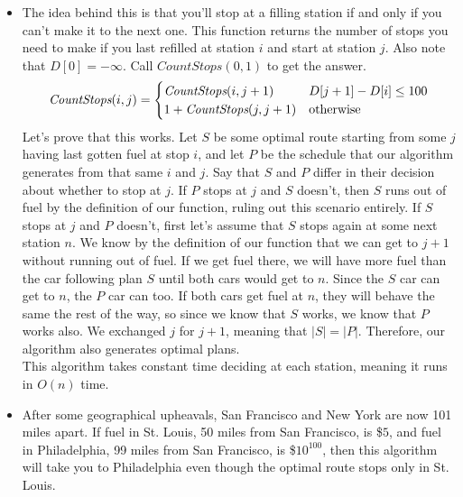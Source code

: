 \documentclass[11pt]{article}
\begin{document}
\begin{solution}
    \begin{itemize}
    \item The idea behind this is that you'll stop at a filling station if and only if you can't make it to the next one. This function returns the number of stops you need to make if you last
        refilled at station $i$ and start at station $j$. Also note that $D[0] = -\infty$. Call $CountStops(0, 1)$ to get the answer.
        \[
            \emph{CountStops}(i, j) = 
            \begin{cases} 
                \emph{CountStops}(i, j + 1) & D[j + 1] - D[i] \leq 100 \\
                            1 + \emph{CountStops}(j, j + 1) & \text{otherwise}
            \end{cases}
            \]
        Let's prove that this works. Let $S$ be some optimal route starting from some $j$ having last gotten fuel at stop $i$, and let $P$ be the schedule that our algorithm generates from that same $i$ and $j$. Say that $S$ and $P$ differ in their decision about whether to stop at $j$. If $P$ stops at $j$ and $S$ doesn't, then $S$ runs out of fuel by the definition of our function, ruling out this scenario entirely. 
            If $S$ stops at $j$ and $P$ doesn't, first let's assume that $S$ stops again at some next station $n$. We know by the definition of our function that we can get to $j + 1$ without running out of fuel. If we get fuel there, we will have more fuel than the car following plan $S$ until both cars would get to $n$. Since the $S$ car can get to $n$, the $P$ car can too. If both cars get fuel at $n$, they will behave the same the rest of the way, so since we know that $S$ works, we know that $P$ works also. We exchanged $j$ for $j + 1$, meaning that $|S| = |P|$. Therefore, our algorithm also generates optimal plans.
            \\ This algorithm takes constant time deciding at each station, meaning it runs in $O(n)$ time.
        \item After some geographical upheavals, San Francisco and New York are now 101 miles apart. If fuel in St. Louis, 50 miles from San Francisco, is \$$5$, and fuel in Philadelphia, 99 miles from San Francisco, is \$$10^{100}$, then this algorithm will take you to Philadelphia even though the optimal route stops only in St. Louis.
    \end{itemize}
\end{solution}
\end{document}
